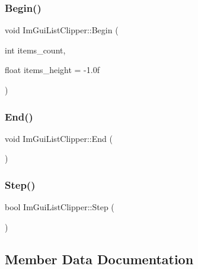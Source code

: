 \subsubsection{\texorpdfstring{Begin()}{Begin()}}
{\footnotesize\ttfamily void Im\+Gui\+List\+Clipper\+::\+Begin (\begin{DoxyParamCaption}\item[{int}]{items\+\_\+count,  }\item[{float}]{items\+\_\+height = {\ttfamily -\/1.0f} }\end{DoxyParamCaption})}

\hypertarget{struct_im_gui_list_clipper_a3e6aec0db317985319a78513fc2c8068}{}\label{struct_im_gui_list_clipper_a3e6aec0db317985319a78513fc2c8068} 
\subsubsection{\texorpdfstring{End()}{End()}}
{\footnotesize\ttfamily void Im\+Gui\+List\+Clipper\+::\+End (\begin{DoxyParamCaption}{ }\end{DoxyParamCaption})}

\hypertarget{struct_im_gui_list_clipper_ac3e115812c3c4e5a39578a7aa955379a}{}\label{struct_im_gui_list_clipper_ac3e115812c3c4e5a39578a7aa955379a} 
\subsubsection{\texorpdfstring{Step()}{Step()}}
{\footnotesize\ttfamily bool Im\+Gui\+List\+Clipper\+::\+Step (\begin{DoxyParamCaption}{ }\end{DoxyParamCaption})}



\subsection{Member Data Documentation}
\hypertarget{struct_im_gui_list_clipper_aa49e30d04ad8f8b95fbaa62dfbb4ea3e}{}\label{struct_im_gui_list_clipper_aa49e30d04ad8f8b95fbaa62dfbb4ea3e} 
